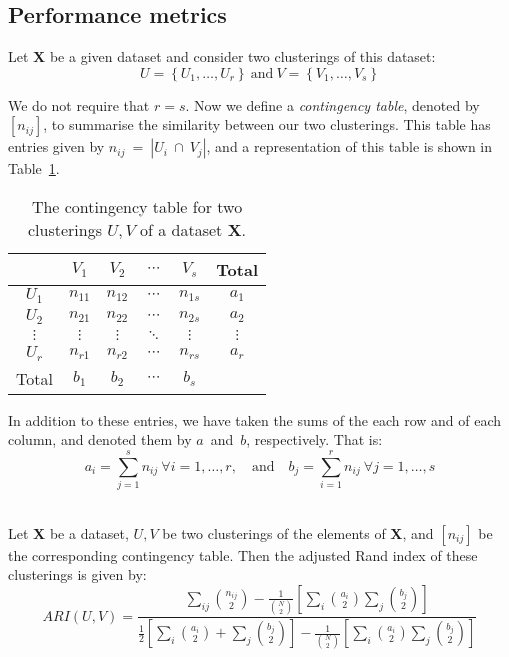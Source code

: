 \subsection{Performance metrics}\label{subsec:metrics}

\begin{definition}\label{def:contingency}
    Let \textbf{X} be a given dataset and consider two clusterings of this
    dataset:
    \[
        U = \left\{U_1, \ldots, U_r\right\}
        \ \text{and} \
        V = \left\{V_1, \ldots, V_s\right\}
    \]

    We do not require that \(r = s\). Now we define a \emph{contingency table},
    denoted by \(\left[n_{ij}\right]\), to summarise the similarity between our
    two clusterings. This table has entries given by
    \(n_{ij}~=~|U_i~\cap~V_j|\), and a representation of this table is shown in
    Table~\ref{tab:contingency}.

    \begin{table}[H]
    \centering
    \begin{tabular}{cccccc}
        {} & \(V_1\) & \(V_2\) & \(\cdots\) & \(V_s\) & Total
        \\ \midrule
        \(U_1\) & \(n_{11}\) & \(n_{12}\) & \(\cdots\) & \(n_{1s}\) & \(a_1\)
        \\
        \(U_2\) & \(n_{21}\) & \(n_{22}\) & \(\cdots\) & \(n_{2s}\) & \(a_2\)
        \\
        \(\vdots\) & \(\vdots\) & \(\vdots\) & \(\ddots\) & \(\vdots\) &
        \(\vdots\)
        \\
        \(U_r\) & \(n_{r1}\) & \(n_{r2}\) & \(\cdots\) & \(n_{rs}\) & \(a_r\)
        \\ \midrule
        Total & \(b_1\) & \(b_2\) & \(\cdots\) & \(b_s\) & {}
    \end{tabular}
    \caption{The contingency table for two clusterings \(U, V\) of a dataset
    \textbf{X}.}\label{tab:contingency}
    \end{table}

    In addition to these entries, we have taken the sums of the each row and of
    each column, and denoted them by \(a\)~and~\(b\), respectively. That is:
    \[
        a_i = \sum_{j=1}^s n_{ij} \ \forall i = 1, \ldots, r, \quad \text{and}
        \quad b_j = \sum_{i=1}^r n_{ij} \ \forall j = 1, \ldots, s
    \]\\
\end{definition}

\begin{definition}\label{def:adjusted-rand-index}
    Let \textbf{X} be a dataset, \(U, V\) be two clusterings of the elements of
    \textbf{X}, and \(\left[n_{ij}\right]\) be the corresponding contingency
    table. Then the adjusted Rand index of these clusterings is given by:
    \[
        ARI(U, V) = \frac{\displaystyle{\sum_{ij} {n_{ij}\choose 2} -
        \frac{1}{{N\choose 2}}\left[\sum_i {a_i\choose 2}\sum_j {b_j\choose
        2}\right]}}{\displaystyle{\frac{1}{2} \left[\sum_i {a_i\choose 2} +
        \sum_j{b_j\choose 2}\right] - \frac{1}{{N\choose 2}}\left[\sum_i
        {a_i\choose 2}\sum_j {b_j\choose 2}\right]}}
    \]
\end{definition}

